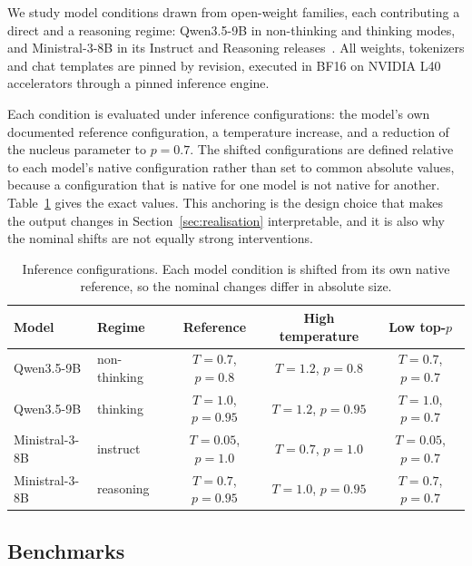 \documentclass[information,article,submit,moreauthors]{Definitions/mdpi}
\begin{document}
We study \NumModelsConditions{} model conditions drawn from
\NumModelFamilies{} open-weight families, each contributing a direct and a
reasoning regime: Qwen3.5-9B in non-thinking and thinking modes, and
Ministral-3-8B in its Instruct and Reasoning
releases~\cite{qwen35card,ministralinstructcard,ministralreasoningcard}. All
weights, tokenizers and chat templates are pinned by revision, executed in BF16
on NVIDIA L40 accelerators through a pinned inference engine.

Each condition is evaluated under \NumCoordinates{} inference configurations:
the model's own documented reference configuration, a temperature increase,
and a reduction of the nucleus parameter to $p=0.7$. The shifted
configurations are defined relative to each model's native configuration rather
than set to common absolute values,
because a configuration that is native for one model is not native for another.
Table~\ref{tab:coordinates} gives the exact values. This anchoring is the design
choice that makes the output changes in Section~\ref{sec:realisation}
interpretable, and it is also
why the nominal shifts are not equally strong interventions.

\begin{table}[H]
\small
\caption{Inference configurations. Each model condition is shifted from its own
native reference, so the nominal changes differ in absolute size.\label{tab:coordinates}}
\begin{tabular}{llccc}
\toprule
\textbf{Model} & \textbf{Regime} & \textbf{Reference} & \textbf{High temperature} & \textbf{Low top-$p$}\\
\midrule
Qwen3.5-9B & non-thinking & $T{=}0.7$, $p{=}0.8$ & $T{=}1.2$, $p{=}0.8$ & $T{=}0.7$, $p{=}0.7$\\
Qwen3.5-9B & thinking & $T{=}1.0$, $p{=}0.95$ & $T{=}1.2$, $p{=}0.95$ & $T{=}1.0$, $p{=}0.7$\\
Ministral-3-8B & instruct & $T{=}0.05$, $p{=}1.0$ & $T{=}0.7$, $p{=}1.0$ & $T{=}0.05$, $p{=}0.7$\\
Ministral-3-8B & reasoning & $T{=}0.7$, $p{=}0.95$ & $T{=}1.0$, $p{=}0.95$ & $T{=}0.7$, $p{=}0.7$\\
\bottomrule
\end{tabular}
\end{table}

\subsection{Benchmarks}
\end{document}
